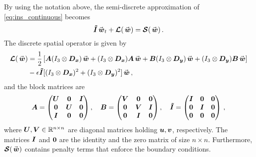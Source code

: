 By using the notation above, the semi-discrete approximation of \eqref{eq:ins_continuous} becomes \cite{nordstrom2019energy}
\begin{equation}
  \label{eq:ins_semi_discrete}
  \Itn \wn_t  + \euln(\wn) = \satn(\wn) \, .
\end{equation}
The discrete spatial operator is given by
\begin{equation*}
\begin{aligned}
  \euln(\wn) &=
  \frac{1}{2}\left[\An (I_3\otimes \Dx)\wn + (I_3\otimes \Dx) \An\wn +
                   \Bn (I_3\otimes \Dy)\wn + (I_3\otimes \Dy) \Bn\wn\right]
  \\
  & - \epsilon \Itn [(I_3\otimes \Dx)^2 + (I_3\otimes \Dy)^2]\wn \, ,
\end{aligned}
\end{equation*}
and the block matrices are
\[
  \bm{A} = 
  \begin{pmatrix}
    \bm{U} & \bm{0} & \bm{I} 
    \\
    \bm{0}  & \bm{U} & \bm{0}
    \\
    \bm{I} & \bm{0} & \bm{0}
  \end{pmatrix}
  ,
  \quad 
  \bm{B} = 
  \begin{pmatrix}
    \bm{V} &  \bm{0} & \bm{0} 
    \\
    \bm{0}  & \bm{V} & \bm{I}
    \\
    \bm{0} & \bm{I} & \bm{0}
  \end{pmatrix}
  ,
  \quad
  \bm{\tilde{I}} = 
  \begin{pmatrix}
    \bm{I} &  \bm{0} & \bm{0} 
    \\
    \bm{0}  & \bm{I} & \bm{0}
    \\
    \bm{0} & \bm{0} & \bm{0}
  \end{pmatrix}
  \, ,
\]
where $\bm{U},\bm{V} \in \mathbb{R}^{n\times n}$ are diagonal matrices holding $\bm{u},\bm{v}$, respectively. The matrices $\bm{I}$ and $\bm{0}$ are the identity and the zero matrix of size $n\times n$. Furthermore, $\satn(\wn)$ contains penalty terms that enforce the boundary conditions. 

